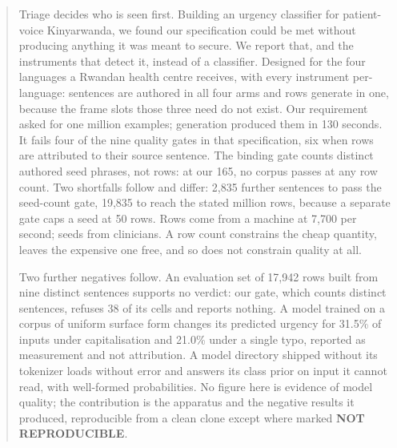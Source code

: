 %
%

\begin{abstract}
Triage decides who is seen first. Building an urgency classifier for
patient-voice Kinyarwanda, we found our specification could be met without
producing anything it was meant to secure. We report that, and the instruments
that detect it, instead of a classifier. Designed for the four languages a Rwandan health
centre receives, with every instrument per-language: sentences are authored in
all four arms and rows generate in one, because the frame slots those three
need do not exist. Our requirement asked for one million
examples; generation produced them in 130 seconds. It fails four of the nine
quality gates in that specification, six when rows are attributed to their
source sentence. The binding gate counts distinct authored
seed phrases, not rows: at our 165, no corpus passes at any row count. Two shortfalls follow and differ: 2{,}835 further sentences to pass the
seed-count gate, 19{,}835 to reach the stated million rows, because a separate
gate caps a seed at 50 rows. Rows come from a machine at
7{,}700 per second; seeds from clinicians.
A row count constrains the cheap quantity, leaves the expensive one free, and
so does not constrain quality at all.

Two further negatives follow. An evaluation set of 17{,}942 rows built from
nine distinct sentences supports no verdict: our gate, which counts distinct
sentences, refuses 38 of its cells and reports nothing. A model trained on a
corpus of uniform surface form changes its predicted urgency for 31.5\% of
inputs under capitalisation and 21.0\% under a single typo, reported as
measurement and not attribution. A model directory shipped without its
tokenizer loads without error and answers its class prior on input it cannot
read, with well-formed probabilities. No figure here is evidence of model
quality; the contribution is the apparatus and the negative results it
produced, reproducible from a clean clone except where marked \textbf{NOT
REPRODUCIBLE}.
\end{abstract}
